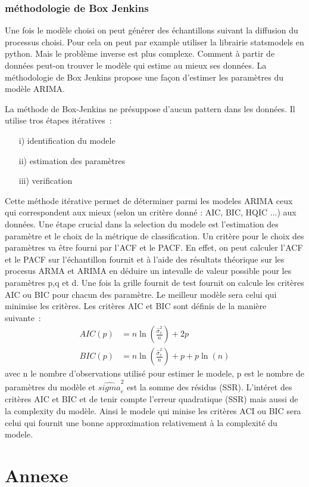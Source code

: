 \documentclass[11pt]{scrartcl} %
\begin{document}
\subsubsection{méthodologie de Box Jenkins}
Une fois le modèle choisi on peut générer des échantillons suivant la diffusion du processus choisi. Pour cela on peut par example utiliser la librairie statsmodels en python. Mais le problème inverse est plus complexe. Comment à partir de données peut-on trouver le modèle qui estime au mieux ses données. La méthodologie de Box Jenkins propose une façon d'estimer les paramètres du modèle ARIMA.


La méthode de Box-Jenkins \cite{BoxJenkins} ne présuppose d'aucun pattern dans les données. Il utilise tros étapes itératives~:
\begin{itemize}
\item[i)] identification du modele
\item[ii)] estimation des paramètres
\item[iii)] verification
\end{itemize}
Cette méthode itérative permet de déterminer parmi les modeles ARIMA ceux qui correspondent aux mieux (selon un critère donné : AIC, BIC, HQIC ...) aux données.
Une étape crucial dans la selection du modele est l'estimation des paramètre et le choix de la métrique de classification. Un critère pour le choix des paramètres va être fourni par l'ACF et le PACF. En effet, on peut calculer l'ACF et le PACF sur l'échantillon fournit et à l'aide des résultats théorique sur les procesus ARMA et ARIMA en déduire un intevalle de valeur possible pour les paramètres p,q et d. Une fois la grille fournit de test fournit on calcule les critères AIC ou BIC pour chacun des paramètre. Le meilleur modèle sera celui qui minimise les critères. Les critères AIC et BIC sont définis de la manière suivante~:
\begin{align*}
AIC(p)&=n\ln\left({\frac{\hat{\sigma}_e^2}{n}}\right)+2p\\
BIC(p)&=n\ln\left({\frac{\hat{\sigma}_e^2}{n}}\right)+p+p\ln(n)
\end{align*}
avec n le nombre d'observations utilisé pour estimer le modele, p est le nombre de paramètres du modèle et $\hat{sigma}_e^2$ est la somme des résidus (SSR). L'intéret des critères AIC et BIC et de tenir compte l'erreur quadratique (SSR) mais aussi de la complexity du modèle. Ainsi le modele qui minise les critères ACI ou BIC sera celui qui fournit une bonne approximation relativement à la complexité du modele.
\section{Annexe}
\end{document}
